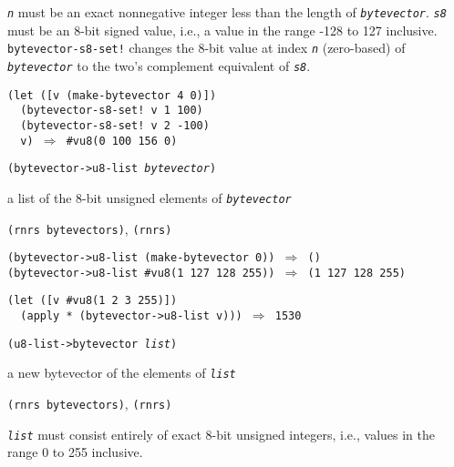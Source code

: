 \texttt{\textit{n}} must be an exact nonnegative integer less than
the length of \texttt{\textit{bytevector}}.
\texttt{\textit{s8}} must be an 8-bit signed value, i.e., a value in the range
-128 to 127 inclusive.
\texttt{bytevector-s8-set!} changes the 8-bit value at index \texttt{\textit{n}}
(zero-based) of \texttt{\textit{bytevector}} to the two's complement equivalent
of \texttt{\textit{s8}}.

\begin{alltt}
(let ([v (make-bytevector 4 0)])
  (bytevector-s8-set! v 1 100)
  (bytevector-s8-set! v 2 -100)
  v) \(\Rightarrow\) \#{}vu8(0 100 156 0)
\end{alltt}

\begin{description}

\label{objects_s252}\item[procedure] \texttt{(bytevector-\textgreater{}u8-list \textit{bytevector})}



\item[returns] a list of the 8-bit unsigned elements of \texttt{\textit{bytevector}}


\item[libraries] \texttt{(rnrs bytevectors)}, \texttt{(rnrs)}
\end{description}


\begin{alltt}
(bytevector-\textgreater{}u8-list (make-bytevector 0)) \(\Rightarrow\) ()
(bytevector-\textgreater{}u8-list \#{}vu8(1 127 128 255)) \(\Rightarrow\) (1 127 128 255)

(let ([v \#{}vu8(1 2 3 255)])
  (apply * (bytevector-\textgreater{}u8-list v))) \(\Rightarrow\) 1530
\end{alltt}

\begin{description}

\label{objects_s253}\item[procedure] \texttt{(u8-list-\textgreater{}bytevector \textit{list})}



\item[returns] a new bytevector of the elements of \texttt{\textit{list}}


\item[libraries] \texttt{(rnrs bytevectors)}, \texttt{(rnrs)}
\end{description}

\texttt{\textit{list}} must consist entirely of
exact 8-bit unsigned integers, i.e., values in the range 0 to 255 inclusive.

